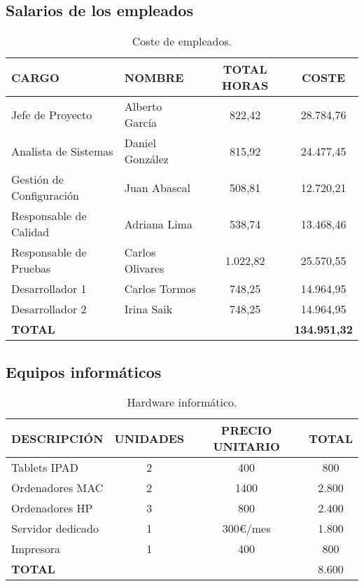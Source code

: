 \documentclass[10pt,a4paper,oldfontcommands]{plantillaDPDS}
\begin{document}
\subsection{Salarios de los empleados}
\begin{table}[H]
\begin{center}
\begin{tabular}{l l c c}
\hline
\textbf{CARGO} & \textbf{NOMBRE} & \textbf{TOTAL HORAS} & \textbf{COSTE}\\ \hline \hline
Jefe de Proyecto & Alberto García & 822,42 & 28.784,76\\
Analista de Sistemas & Daniel González & 815,92 & 24.477,45\\
Gestión de Configuración & Juan Abascal & 508,81 & 12.720,21\\
Responsable de Calidad & Adriana Lima & 538,74 & 13.468,46\\
Responsable de Pruebas & Carlos Olivares & 1.022,82 & 25.570,55\\
Desarrollador 1 & Carlos Tormos & 748,25 & 14.964,95\\
Desarrollador 2 & Irina Saik & 748,25 & 14.964,95\\ \hline \hline
\textbf{TOTAL} & & & \textbf{134.951,32} \\ \hline
\end{tabular}
\caption{Coste de empleados.}
\label{tab:costePersonal}
\end{center}
\end{table}



\subsection{Equipos informáticos}
\begin{table}[H]
\begin{center}
\begin{tabular}{l c c c}
\textbf{DESCRIPCIÓN} & \textbf{UNIDADES} & \textbf{PRECIO UNITARIO} & \textbf{TOTAL}\\ \hline \hline
Tablets IPAD & 2 & 400 & 800\\
Ordenadores MAC & 2 & 1400 & 2.800\\
Ordenadores HP & 3 & 800 & 2.400\\
Servidor dedicado & 1 & 300\euro/mes & 1.800\\
Impresora & 1 & 400 & 800\\ \hline \hline
\textbf{TOTAL} & & & 8.600\\\hline
\end{tabular}
\caption{Hardware informático.}
\label{tab:hardware}
\end{center}
\end{table}
\end{document}

